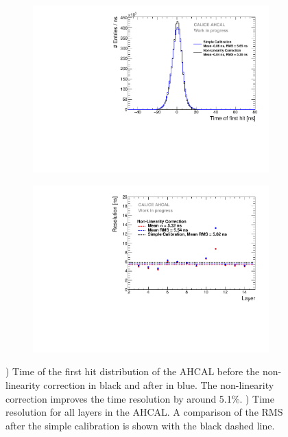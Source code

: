 \begin{figure}[htbp!]
	\begin{subfigure}[t]{0.5\textwidth}
		\centering
		\includegraphics[width=1\textwidth]{../Thesis_Plots/Timing/Muons/Plots/Timing_AHCAL_LinCorrection.pdf}
		\caption{}\label{fig:timing_lincorrection}
	\end{subfigure}
	\hfill
	\begin{subfigure}[t]{0.5\textwidth}
		\centering
		\includegraphics[width=1\textwidth]{../Thesis_Plots/Timing/Muons/Plots/ResolutionPerModule_LinCorrection.pdf}
		\caption{}\label{fig:reso_lincorrection}
	\end{subfigure}
	\caption{) Time of the first hit distribution of the AHCAL before the non-linearity correction in black and after in blue. The non-linearity correction improves the time resolution by around 5.1\%. ) Time resolution for all layers in the AHCAL. A comparison of the RMS after the simple calibration is shown with the black dashed line.}
\end{figure}


